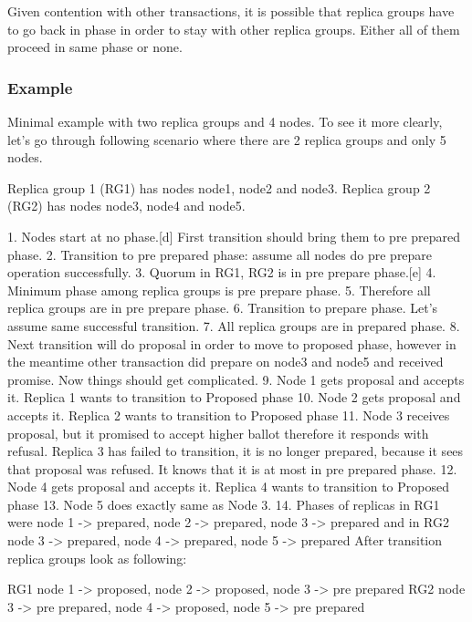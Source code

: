 Given contention with other transactions, it is possible that replica groups have to go back in phase in order to stay with other replica groups. Either all of them proceed in same phase or none.


\subsubsection{Example}
Minimal example with two replica groups and 4 nodes.
To see it more clearly, let’s go through following scenario where there are 2 replica groups and only 5 nodes. 


Replica group 1 (RG1) has nodes node1, node2 and node3. 
Replica group 2 (RG2) has nodes node3, node4 and node5.


1. Nodes start at no phase.[d] First transition should bring them to pre prepared phase.
2. Transition to pre prepared phase: assume all nodes do pre prepare operation successfully.
3. Quorum in RG1, RG2 is in pre prepare phase.[e]
4. Minimum phase among replica groups is pre prepare phase.
5. Therefore all replica groups are in pre prepare phase.
6. Transition to prepare phase. Let’s assume same successful transition.
7. All replica groups are in prepared phase.
8. Next transition will do proposal in order to move to proposed phase, however in the meantime other transaction did prepare on node3 and node5 and received promise. Now things should get complicated. 
9. Node 1 gets proposal and accepts it. Replica 1 wants to transition to Proposed phase
10. Node 2 gets proposal and accepts it. Replica 2 wants to transition to Proposed phase
11. Node 3 receives proposal, but it promised to accept higher ballot therefore it responds with refusal. Replica 3 has failed to transition, it is no longer prepared, because it sees that proposal was refused. It knows that it is at most in pre prepared phase. 
12. Node 4 gets proposal and accepts it. Replica 4 wants to transition to Proposed phase
13. Node 5 does exactly same as Node 3.
14. Phases of replicas in RG1 were { node 1 -> prepared, node 2 -> prepared, node 3 -> prepared } and in RG2 { node 3 -> prepared, node 4 -> prepared, node 5 -> prepared }
        After transition replica groups look as following:


RG1 { node 1 -> proposed, node 2 -> proposed, node 3 -> pre prepared }
RG2 { node 3 -> pre prepared, node 4 -> proposed, node 5 -> pre prepared }


